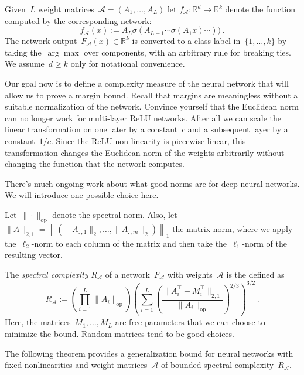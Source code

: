 \documentclass{tufte-book}
\begin{document}
Given~\(L\) weight matrices~\(\mathcal{A} = (A_1,\ldots,A_L)\) let
\(f_\mathcal{A}\colon\mathbb{R}^d\to\mathbb{R}^k\) denote the function
computed by the corresponding network: \[
  f_\mathcal{A}(x) := A_L\sigma(A_{L-1} \cdots \sigma(A_1 x)\cdots))\,.
\] The network output~\(F_\mathcal{A}(x)\in\mathbb{R}^{k}\) is converted
to a class label in~\(\{1,\ldots,k\}\) by taking the~\(\arg\max\) over
components, with an arbitrary rule for breaking ties. We
assume~\(d\ge k\) only for notational convenience.

Our goal now is to define a complexity measure of the neural network
that will allow us to prove a margin bound. Recall that margins are
meaningless without a suitable normalization of the network. Convince
yourself that the Euclidean norm can no longer work for multi-layer ReLU
networks. After all we can scale the linear transformation on one later
by a constant~\(c\) and a subsequent layer by a constant~\(1/c\). Since
the ReLU non-linearity is piecewise linear, this transformation changes
the Euclidean norm of the weights arbitrarily without changing the
function that the network computes.

There's much ongoing work about what good norms are for deep neural
networks. We will introduce one possible choice here.

Let~\(\|\cdot\|_{\mathrm{op}}\) denote the spectral norm. Also, let
\(\|A\|_{2,1}=\left\| (\|{}A_{:,1}\|_2, \ldots, \|{}A_{:,m} \|_2)\right\|_1\)
the matrix norm, where we apply the~\(\ell_2\)-norm to each column of
the matrix and then take the~\(\ell_1\)-norm of the resulting vector.

The \emph{spectral complexity} \(R_\mathcal{A}\) of a
network~\(F_\mathcal{A}\) with weights~\(\mathcal{A}\) is the defined as
\begin{equation}   R_{\mathcal{A}}   :=   \left(\prod_{i=1}^L\|A_i\|_{\mathrm{op}}\right)   \left(\sum_{i=1}^L \left(\frac{ \|A_i^{\top} - M_i^{\top}\|_{2,1}}{\|A_i\|_{\mathrm{op}}}\right)^{2/3}\right)^{3/2}\,.   \label{eq:spec_comp} \end{equation}
Here, the matrices~\(M_1,\dots, M_L\) are free parameters that we can
choose to minimize the bound. Random matrices tend to be good choices.

The following theorem provides a generalization bound for neural
networks with fixed nonlinearities and weight matrices~\(\mathcal{A}\)
of bounded spectral complexity~\(R_{\mathcal{A}}\).
\end{document}
